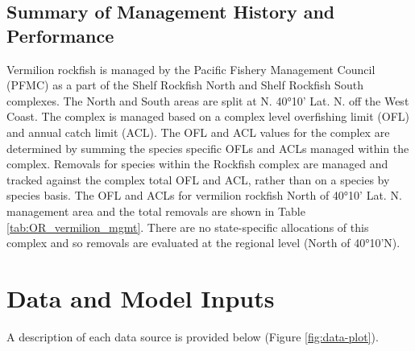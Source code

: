 \documentclass[11pt,
  english,
  a4paper,
]{article}
\begin{document}
\leavevmode\tagmcend\tagstructend\par


\hypertarget{summary-of-management-history-and-performance}{%
\subsection{Summary of Management History and Performance}\label{summary-of-management-history-and-performance}}

\leavevmode\tagmcend\tagstructend


Vermilion rockfish is managed by the Pacific Fishery Management Council (PFMC) as a part of the Shelf Rockfish North and Shelf Rockfish South complexes. The North and South areas are split at N. 40°10' Lat. N. off the West Coast. The complex is managed based on a complex level overfishing limit (OFL) and annual catch limit (ACL). The OFL and ACL values for the complex are determined by summing the species specific OFLs and ACLs managed within the complex. Removals for species within the Rockfish complex are managed and tracked against the complex total OFL and ACL, rather than on a species by species basis. The OFL and ACLs for vermilion rockfish North of 40°10' Lat. N. management area and the total removals are shown in Table \ref{tab:OR_vermilion_mgmt}. There are no state-specific allocations of this complex and so removals are evaluated at the regional level (North of 40°10'N).

\leavevmode\tagmcend\tagstructend\par


\hypertarget{data-and-model-inputs}{%
\section{Data and Model Inputs}\label{data-and-model-inputs}}

\leavevmode\tagmcend\tagstructend


A description of each data source is provided below (Figure \ref{fig:data-plot}).

\leavevmode\tagmcend\tagstructend\par

\end{document}

